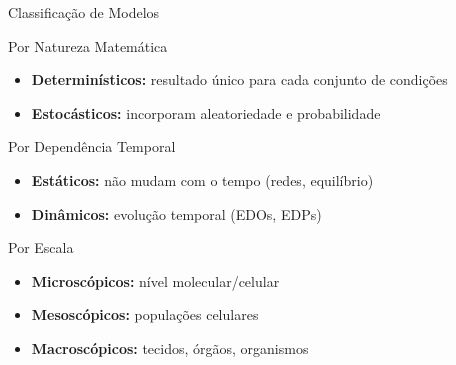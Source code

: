 \begin{frame}{Classificação de Modelos}
\begin{block}{Por Natureza Matemática}
\begin{itemize}
    \item \textbf{Determinísticos:} resultado único para cada conjunto de condições
    \item \textbf{Estocásticos:} incorporam aleatoriedade e probabilidade
\end{itemize}
\end{block}

\begin{block}{Por Dependência Temporal}
\begin{itemize}
    \item \textbf{Estáticos:} não mudam com o tempo (redes, equilíbrio)
    \item \textbf{Dinâmicos:} evolução temporal (EDOs, EDPs)
\end{itemize}
\end{block}

\begin{block}{Por Escala}
\begin{itemize}
    \item \textbf{Microscópicos:} nível molecular/celular
    \item \textbf{Mesoscópicos:} populações celulares
    \item \textbf{Macroscópicos:} tecidos, órgãos, organismos
\end{itemize}
\end{block}
\end{frame}

